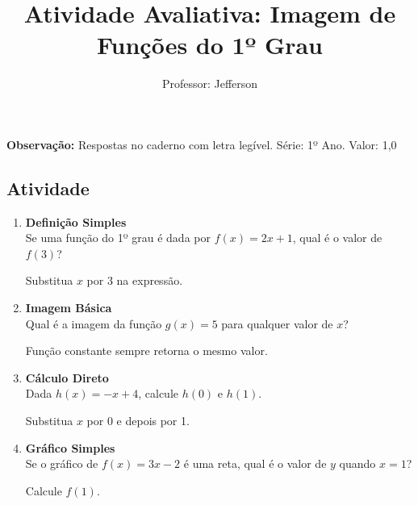 \documentclass[11pt]{article}
\title{\textcolor{titleblue}{Atividade Avaliativa: Imagem de Funções do 1º Grau}}
\author{Professor: Jefferson}
\date{}
\begin{document}
\maketitle
\vspace{-1cm}

\begin{center}
    \large{\textbf{Observação:} Respostas no caderno com letra legível. \quad Série: 1º Ano. Valor: 1,0}
\end{center}

\begin{multicols}{2}

\section*{Atividade}
\begin{enumerate}

\item \textbf{Definição Simples}\\
Se uma função do 1º grau é dada por \( f(x) = 2x + 1 \), qual é o valor de \( f(3) \)?
\begin{tcolorbox}[colback=explanationbg,colframe=titleblue,title=Dica:]
Substitua \( x \) por 3 na expressão.
\end{tcolorbox}

\item \textbf{Imagem Básica}\\
Qual é a imagem da função \( g(x) = 5 \) para qualquer valor de \( x \)?
\begin{tcolorbox}[colback=explanationbg,colframe=titleblue,title=Dica:]
Função constante sempre retorna o mesmo valor.
\end{tcolorbox}

\item \textbf{Cálculo Direto}\\
Dada \( h(x) = -x + 4 \), calcule \( h(0) \) e \( h(1) \).
\begin{tcolorbox}[colback=explanationbg,colframe=titleblue,title=Dica:]
Substitua \( x \) por 0 e depois por 1.
\end{tcolorbox}

\item \textbf{Gráfico Simples}\\
Se o gráfico de \( f(x) = 3x - 2 \) é uma reta, qual é o valor de \( y \) quando \( x = 1 \)?
\begin{tcolorbox}[colback=explanationbg,colframe=titleblue,title=Dica:]
Calcule \( f(1) \).
\end{tcolorbox}


\end{enumerate}
\end{multicols}
\end{document}
